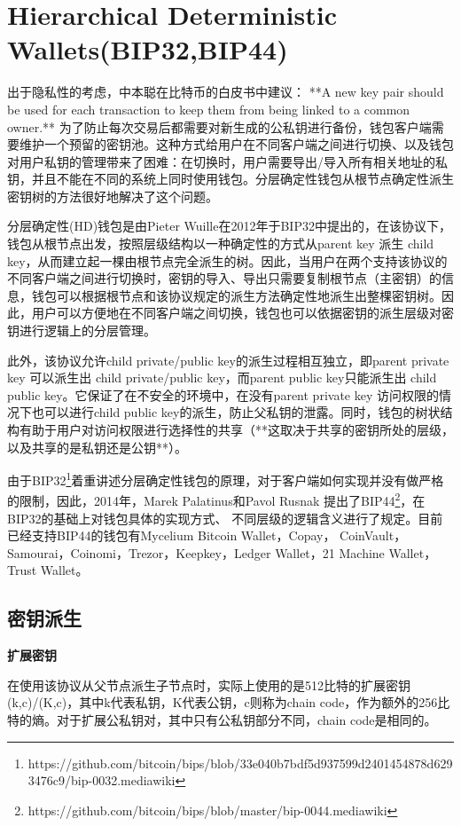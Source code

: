 \section{Hierarchical Deterministic Wallets(BIP32,BIP44)}

出于隐私性的考虑，中本聪在比特币的白皮书中建议： **A new key pair should be used for each transaction to keep them
from being linked to a common owner.** 为了防止每次交易后都需要对新生成的公私钥进行备份，钱包客户端需要维护一个预留的密钥池。这种方式给用户在不同客户端之间进行切换、以及钱包对用户私钥的管理带来了困难：在切换时，用户需要导出/导入所有相关地址的私钥，并且不能在不同的系统上同时使用钱包。分层确定性钱包从根节点确定性派生密钥树的方法很好地解决了这个问题。

分层确定性(HD)钱包是由Pieter Wuille在2012年于BIP32中提出的，在该协议下，钱包从根节点出发，按照层级结构以一种确定性的方式从parent key 派生 child key，从而建立起一棵由根节点完全派生的树。因此，当用户在两个支持该协议的不同客户端之间进行切换时，密钥的导入、导出只需要复制根节点（主密钥）的信息，钱包可以根据根节点和该协议规定的派生方法确定性地派生出整棵密钥树。因此，用户可以方便地在不同客户端之间切换，钱包也可以依据密钥的派生层级对密钥进行逻辑上的分层管理。
  
此外，该协议允许child private/public key的派生过程相互独立，即parent private key 可以派生出 child private/public key，而parent public key只能派生出 child public key。它保证了在不安全的环境中，在没有parent private key 访问权限的情况下也可以进行child public key的派生，防止父私钥的泄露。同时，钱包的树状结构有助于用户对访问权限进行选择性的共享（**这取决于共享的密钥所处的层级，以及共享的是私钥还是公钥**）。  

由于BIP32\footnote{https://github.com/bitcoin/bips/blob/33e040b7bdf5d937599d2401454878d6293476c9/bip-0032.mediawiki}着重讲述分层确定性钱包的原理，对于客户端如何实现并没有做严格的限制，因此，2014年，Marek Palatinus和Pavol Rusnak 提出了BIP44\footnote{https://github.com/bitcoin/bips/blob/master/bip-0044.mediawiki}，在BIP32的基础上对钱包具体的实现方式、 不同层级的逻辑含义进行了规定。目前已经支持BIP44的钱包有Mycelium Bitcoin Wallet，Copay， CoinVault，Samourai，Coinomi，Trezor，Keepkey，Ledger Wallet，21 Machine Wallet， Trust Wallet。  

\subsection{密钥派生}

\textbf{扩展密钥}

 在使用该协议从父节点派生子节点时，实际上使用的是512比特的扩展密钥(k,c)/(K,c)，其中k代表私钥，K代表公钥，c则称为chain code，作为额外的256比特的熵。对于扩展公私钥对，其中只有公私钥部分不同，chain code是相同的。
 
